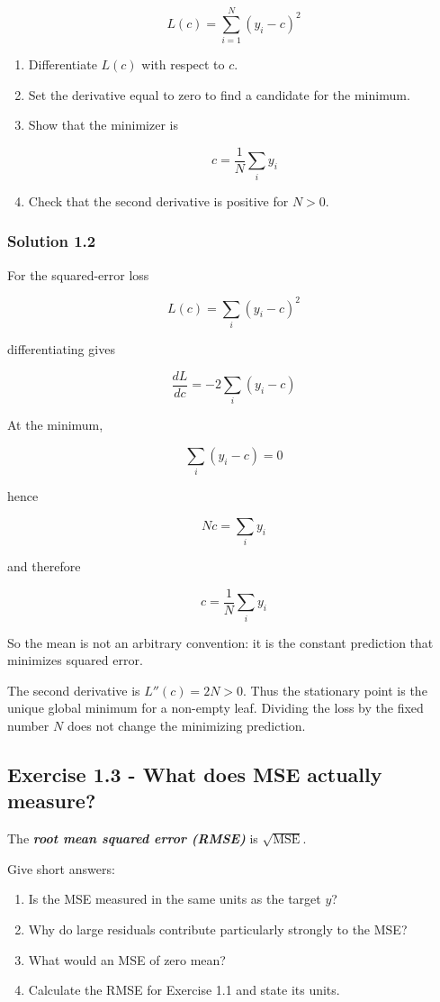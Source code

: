 \documentclass[10pt]{article}
\begin{document}
\[
L(c)=\sum_{i=1}^{N}(y_i-c)^2
\]

\begin{enumerate}
\item
Differentiate $L(c)$ with respect to $c$.

\item
Set the derivative equal to zero to find a candidate for the minimum.

\item
Show that the minimizer is

\[
c=\frac{1}{N}\sum_i y_i
\]

\item
Check that the second derivative is positive for $N>0$.

\end{enumerate}
\begingroup\color{red}

\subsubsection*{Solution 1.2}
For the squared-error loss

\[
L(c)=\sum_i(y_i-c)^2
\]

differentiating gives

\[
\frac{dL}{dc}=-2\sum_i(y_i-c)
\]

At the minimum,

\[
\sum_i(y_i-c)=0
\]

hence

\[
Nc=\sum_i y_i
\]

and therefore

\[
c=\frac{1}{N}\sum_i y_i
\]

So the mean is not an arbitrary convention: it is the constant
prediction that minimizes squared error.

The second derivative is $L''(c)=2N>0$. Thus the stationary point is the
unique global minimum for a non-empty leaf. Dividing the loss by the
fixed number $N$ does not change the minimizing prediction.

\par\endgroup

\subsection*{Exercise 1.3 - What does MSE actually measure?}
The \textbf{\textit{root mean squared error (RMSE)}} is $\sqrt{\mathrm{MSE}}$.

Give short answers:

\begin{enumerate}
\item
Is the MSE measured in the same units as the target $y$?

\item
Why do large residuals contribute particularly strongly to the MSE?

\item
What would an MSE of zero mean?

\item
Calculate the RMSE for Exercise 1.1 and state its units.

\end{enumerate}
\begingroup\color{red}
\end{document}
